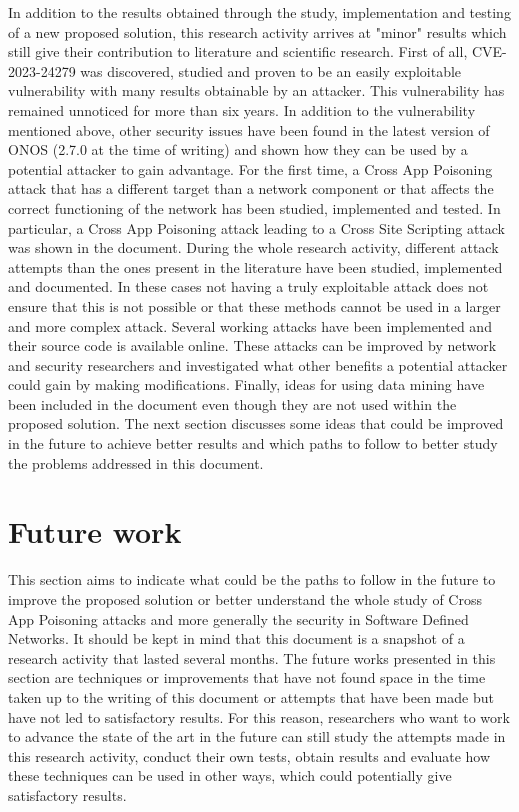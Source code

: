 {%
In addition to the results obtained through the study, implementation and testing of a new proposed solution, this research activity arrives at "minor" results which still give their contribution to literature and scientific research. First of all, CVE-2023-24279 was discovered, studied and proven to be an easily exploitable vulnerability with many results obtainable by an attacker. This vulnerability has remained unnoticed for more than six years. In addition to the vulnerability mentioned above, other security issues have been found in the latest version of ONOS (2.7.0 at the time of writing) and shown how they can be used by a potential attacker to gain advantage. For the first time, a Cross App Poisoning attack that has a different target than a network component or that affects the correct functioning of the network has been studied, implemented and tested. In particular, a Cross App Poisoning attack leading to a Cross Site Scripting attack was shown in the document. During the whole research activity, different attack attempts than the ones present in the literature have been studied, implemented and documented. In these cases not having a truly exploitable attack does not ensure that this is not possible or that these methods cannot be used in a larger and more complex attack. Several working attacks have been implemented and their source code is available online. These attacks can be improved by network and security researchers and investigated what other benefits a potential attacker could gain by making modifications. Finally, ideas for using data mining have been included in the document even though they are not used within the proposed solution. The next section discusses some ideas that could be improved in the future to achieve better results and which paths to follow to better study the problems addressed in this document.

\clearpage

\section{Future work}
This section aims to indicate what could be the paths to follow in the future to improve the proposed solution or better understand the whole study of Cross App Poisoning attacks and more generally the security in Software Defined Networks. It should be kept in mind that this document is a snapshot of a research activity that lasted several months. The future works presented in this section are techniques or improvements that have not found space in the time taken up to the writing of this document or attempts that have been made but have not led to satisfactory results. For this reason, researchers who want to work to advance the state of the art in the future can still study the attempts made in this research activity, conduct their own tests, obtain results and evaluate how these techniques can be used in other ways, which could potentially give satisfactory results.
\medskip

}
